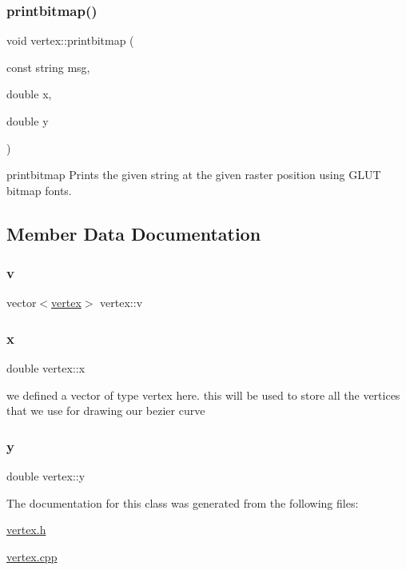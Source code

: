 \subsubsection{\texorpdfstring{printbitmap()}{printbitmap()}}
{\footnotesize\ttfamily void vertex\+::printbitmap (\begin{DoxyParamCaption}\item[{const string}]{msg,  }\item[{double}]{x,  }\item[{double}]{y }\end{DoxyParamCaption})}

printbitmap Prints the given string at the given raster position using G\+L\+UT bitmap fonts. 

\subsection{Member Data Documentation}
\mbox{\label{classvertex_a3d22584dccb715b7f0d25b73825330ad}} 
\subsubsection{\texorpdfstring{v}{v}}
{\footnotesize\ttfamily vector$<$\hyperlink{classvertex}{vertex}$>$ vertex\+::v}

\mbox{\label{classvertex_a11f52ec2e920d56500baefe5a2e2bba7}} 
\subsubsection{\texorpdfstring{x}{x}}
{\footnotesize\ttfamily double vertex\+::x}

we defined a vector of type vertex here. this will be used to store all the vertices that we use for drawing our bezier curve \mbox{\label{classvertex_a8b9f211498390a67c369fd43f3722a19}} 
\subsubsection{\texorpdfstring{y}{y}}
{\footnotesize\ttfamily double vertex\+::y}



The documentation for this class was generated from the following files\+:\begin{DoxyCompactItemize}
\item 
\hyperlink{vertex_8h}{vertex.\+h}\item 
\hyperlink{vertex_8cpp}{vertex.\+cpp}\end{DoxyCompactItemize}
